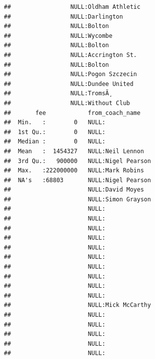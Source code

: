 \documentclass{article}\usepackage[]{graphicx}\usepackage[]{color}
\makeatletter
\newenvironment{kframe}{%
 \def\at@end@of@kframe{}%
 \ifinner\ifhmode%
  \def\at@end@of@kframe{\end{minipage}}%
  \begin{minipage}{\columnwidth}%
 \fi\fi%
 \def\FrameCommand##1{\hskip\@totalleftmargin \hskip-\fboxsep
 \colorbox{shadecolor}{##1}\hskip-\fboxsep
     \hskip-\linewidth \hskip-\@totalleftmargin \hskip\columnwidth}%
 \MakeFramed {\advance\hsize-\width
   \@totalleftmargin\z@ \linewidth\hsize
   \@setminipage}}%
 {\par\unskip\endMakeFramed%
 \at@end@of@kframe}
\newenvironment{knitrout}{}{} %
\makeatother
\begin{document}
\begin{knitrout}
\begin{kframe}
\begin{verbatim}
##                 NULL:Oldham Athletic                                               
##                 NULL:Darlington                                                    
##                 NULL:Bolton                                                        
##                 NULL:Wycombe                                                       
##                 NULL:Bolton                                                        
##                 NULL:Accrington St.                                                
##                 NULL:Bolton                                                        
##                 NULL:Pogon Szczecin                                                
##                 NULL:Dundee United                                                 
##                 NULL:TromsÃ¸                                                       
##                 NULL:Without Club                                                  
##       fee            from_coach_name                         
##  Min.   :        0   NULL:                                   
##  1st Qu.:        0   NULL:                                   
##  Median :        0   NULL:                                   
##  Mean   :  1454327   NULL:Neil Lennon                        
##  3rd Qu.:   900000   NULL:Nigel Pearson                      
##  Max.   :222000000   NULL:Mark Robins                        
##  NA's   :68803       NULL:Nigel Pearson                      
##                      NULL:David Moyes                        
##                      NULL:Simon Grayson                      
##                      NULL:                                   
##                      NULL:                                   
##                      NULL:                                   
##                      NULL:                                   
##                      NULL:                                   
##                      NULL:                                   
##                      NULL:                                   
##                      NULL:                                   
##                      NULL:                                   
##                      NULL:                                   
##                      NULL:Mick McCarthy                      
##                      NULL:                                   
##                      NULL:                                   
##                      NULL:                                   
##                      NULL:                                   
##                      NULL:                                   

\end{verbatim}
\end{kframe}
\end{knitrout}
\end{document}
